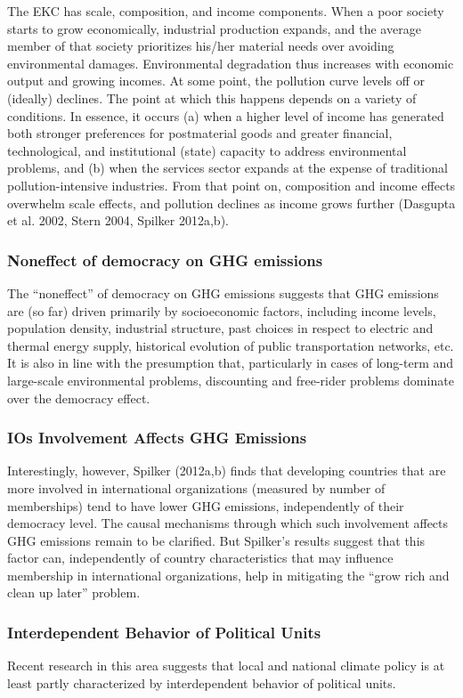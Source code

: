 The EKC has scale, composition, and income components. When a poor society starts to grow economically, industrial production expands, and the average member of that society prioritizes his/her material needs over avoiding environmental damages. Environmental degradation thus increases with economic output and growing incomes. At some point, the pollution curve levels off or (ideally) declines. The point at which this happens depends on a variety of conditions. In essence, it occurs (a) when a higher level of income has generated both stronger preferences for postmaterial goods and greater financial, technological, and institutional (state) capacity to address environmental problems, and (b) when the services sector expands at the expense of traditional pollution-intensive industries. From that point on, composition and income effects overwhelm scale effects, and pollution declines as income grows further (Dasgupta et al. 2002, Stern 2004, Spilker 2012a,b).

\subsubsection{Noneffect of democracy on GHG emissions}
The “noneffect” of democracy on GHG emissions suggests that GHG emissions are (so far) driven primarily by socioeconomic factors, including income levels, population density, industrial structure, past choices in respect to electric and thermal energy supply, historical evolution of public transportation networks, etc. It is also in line with the presumption that, particularly in cases of long-term and large-scale environmental problems, discounting and free-rider problems dominate over the democracy effect.

\subsubsection{IOs Involvement Affects GHG Emissions}
Interestingly, however, Spilker (2012a,b) finds that developing countries that are more involved in international organizations (measured by number of memberships) tend to have lower GHG emissions, independently of their democracy level. The causal mechanisms through which such involvement affects GHG emissions remain to be clarified. But Spilker’s results suggest that this factor can, independently of country characteristics that may influence membership in international organizations, help in mitigating the “grow rich and clean up later” problem.

\subsubsection{Interdependent Behavior of Political Units}
Recent research in this area suggests that local and national climate policy is at least partly characterized by interdependent behavior of political units.

